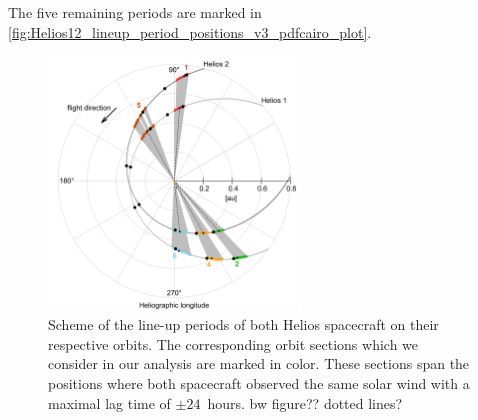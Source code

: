 The five remaining periods are marked in \autoref{fig:Helios12_lineup_period_positions_v3_pdfcairo_plot}.
\begin{figure}[htb]
	\centering
	\includegraphics[width=0.6\textwidth]{images/gnuplots/Helios12_lineup_period_positions_v3_pdfcairo_plot.pdf}
	\caption{Scheme of the line-up periods of both Helios spacecraft on their respective orbits. The corresponding orbit sections which we consider in our analysis are marked in color. These sections span the positions where both spacecraft observed the same solar wind with a maximal lag time of $\pm24$~hours. bw figure?? dotted lines?}
	\label{fig:Helios12_lineup_period_positions_v3_pdfcairo_plot}
\end{figure}

